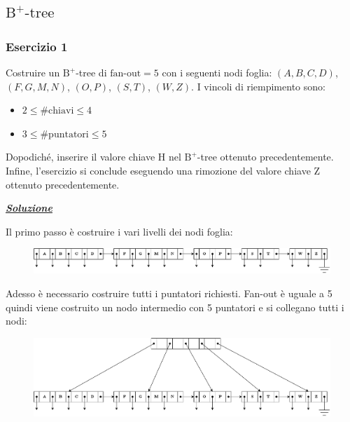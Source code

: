\documentclass[a4paper]{article}
\begin{document}
	\subsection[$\mathrm{B^{+}\text{-}tree}$]{$\boldsymbol{\mathrm{B^{+}\text{-}tree}}$}
	
	\subsubsection{Esercizio 1}
	
	Costruire un $\mathrm{B}^{+}$-tree di $\text{fan-out} = 5$ con i seguenti nodi foglia: $\left(A,B,C,D\right)$, $\left(F,G,M,N\right)$, $\left(O,P\right)$, $\left(S,T\right)$, $\left(W,Z\right)$. I vincoli di riempimento sono:
	\begin{itemize}
		\item $2 \le \text{\#chiavi} \le 4$
		
		\item $3 \le \text{\#puntatori} \le 5$
	\end{itemize}
	Dopodiché, inserire il valore chiave H nel $\mathrm{B}^{+}$-tree ottenuto precedentemente. Infine, l'esercizio si conclude eseguendo una rimozione del valore chiave Z ottenuto precedentemente.\newline
	
	\noindent
	\textcolor{Green4}{\textbf{\emph{\underline{Soluzione}}}}\newline
	
	\noindent
	Il primo passo è costruire i vari livelli dei nodi foglia:
	\begin{figure}[!htp]
		\centering
		\includegraphics[width=\textwidth]{img/b+-tree.pdf}
	\end{figure}
	
	\noindent
	Adesso è necessario costruire tutti i puntatori richiesti. Fan-out è uguale a 5 quindi viene costruito un nodo intermedio con 5 puntatori e si collegano tutti i nodi:
	\begin{figure}[!htp]
		\centering
		\includegraphics[width=\textwidth]{img/b+-tree-1.pdf}
	\end{figure}
	
\end{document}
